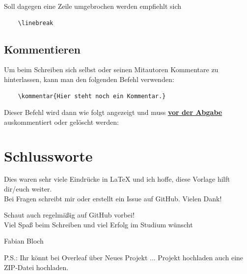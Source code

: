 Soll dagegen eine Zeile umgebrochen werden empfiehlt sich 

\begin{verbatim}
    \linebreak
\end{verbatim}


\subsection{Kommentieren}

Um beim Schreiben sich selbst oder seinen Mitautoren Kommentare zu hinterlassen, kann man den folgenden Befehl verwenden:

\begin{verbatim}
    \kommentar{Hier steht noch ein Kommentar.}
\end{verbatim}

Dieser Befehl wird dann wie folgt angezeigt und muss \textbf{\underline{vor der Abgabe}} auskommentiert oder gelöscht werden:



\vfill
\section{Schlussworte}

Dies waren sehr viele Eindrücke in \LaTeX{} und ich hoffe, diese Vorlage hilft dir/euch weiter.\\

Bei Fragen schreibt mir oder erstellt ein Issue auf GitHub. Vielen Dank!

Schaut auch regelmäßig auf GitHub vorbei!\\

Viel Spaß beim Schreiben und viel Erfolg im Studium wünscht

Fabian Bloch

\vspace{7mm}
\textcolor{HCU}{P.S.: Ihr könnt bei Overleaf über \glqq Neues Projekt ... Projekt hochladen\grqq{} auch eine ZIP-Datei hochladen.}